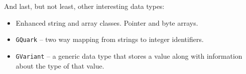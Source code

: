 And last, but not least, other interesting data types:
\begin{itemize}
  \item Enhanced string and array classes. Pointer and byte arrays.
  \item \lstinline{GQuark} -- two way mapping from strings to integer identifiers.
  \item \lstinline{GVariant} -- a generic data type that stores a value along with information about the type of that value.
\end{itemize}
